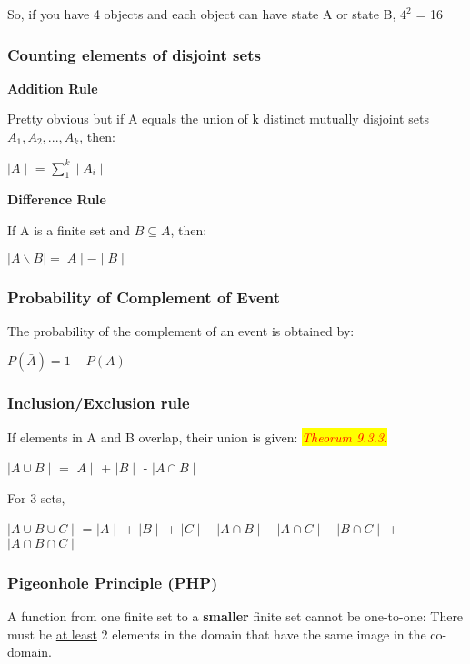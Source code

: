 \documentclass{article}
\newcommand{\theorum}[1]{\quad \quad \colorbox{yellow}{\textit{\textcolor{red}{Theorum #1}}}}
\newcommand{\sub}[1]{\vspace{10pt}\textbf{#1}}
\newcommand{\sbreak}{\vspace{10pt}}
\begin{document}
\sbreak

So, if you have 4 objects and each object can have state A or state B, $4^2$ = 16

\subsubsection{Counting elements of disjoint sets}
\sub{Addition Rule}

Pretty obvious but if A equals the union of k distinct mutually disjoint sets $A_1, A_2,...,A_k$, then:
\begin{center}
    $\mid A \mid$ = $\sum_{1}^{k} \mid A_i \mid $
\end{center}

\sub{Difference Rule}

If A is a finite set and $B \subseteq A$, then:

$\mid A \backslash B \mid = \mid A \mid  - \mid B \mid$

\subsubsection{Probability of Complement of Event}
The probability of the complement of an event is obtained by:
\begin{center}
    $P(\bar{A})=1-P(A)$
\end{center}

\subsubsection{Inclusion/Exclusion rule}
If elements in A and B overlap, their union is given: \theorum{9.3.3.}
\begin{center}
    $\mid A \cup B \mid$ = $\mid A \mid$ + $\mid B \mid$ - $\mid A \cap B \mid$
\end{center}

For 3 sets,

\begin{center}
    $\mid A \cup B \cup C \mid$ = $\mid A \mid$ + $\mid B \mid$ + $\mid C \mid$ - $\mid A \cap B \mid$ - $\mid A \cap C \mid$ - $\mid B \cap C \mid$ + $\mid A \cap B \cap C \mid$
\end{center}

\subsubsection{Pigeonhole Principle (PHP)}
A function from one finite set to a \textbf{smaller} finite set cannot be one-to-one: There must be \underline{at least} 2 elements in the domain that have the same image in the co-domain.
\end{document}
